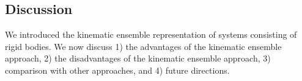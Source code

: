 \documentclass[../../main.tex]{subfiles}
\begin{document}
\begin{refsection}




	\section{Discussion}\label{discussion}




	We introduced the kinematic ensemble representation of systems consisting of rigid bodies.
	We now discuss
	1) the advantages of the kinematic ensemble approach,
	2) the disadvantages of the kinematic ensemble approach,
	3) comparison with other approaches, and %
	4) future directions.



\end{refsection}
\end{document}
